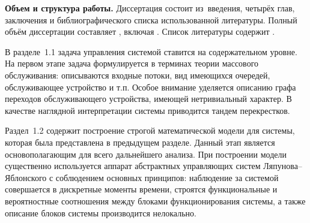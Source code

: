 







\textbf{Объем и структура работы.} Диссертация состоит из~введения, четырёх глав, заключения и библиографического списка использованной литературы. 
%
Полный объём диссертации составляет
, включая
. %
 Список литературы содержит  
.

В разделе~1.1 задача управления системой ставится на содержательном уровне. На первом этапе задача формулируется в терминах теории массового обслуживания: описываются входные потоки, вид имеющихся очередей, обслуживающее устройство и т.п. Особое внимание уделяется описанию графа переходов обслуживающего устройства, имеющей нетривиальный характер. В качестве наглядной интерпретации системы приводится тандем перекрестков. 

Раздел~1.2 содержит построение строгой математической модели для системы, которая была представлена в предыдущем разделе. Данный этап является основополагающим для всего дальнейшего анализа.  При построении модели существенно используется аппарат абстрактных управляющих систем Ляпунова--Яблонского с соблюдением основных принципов: наблюдение за системой совершается в дискретные моменты времени,  строятся функциональные и вероятностные соотношения между блоками функционирования системы, а также описание блоков системы производится нелокально.

